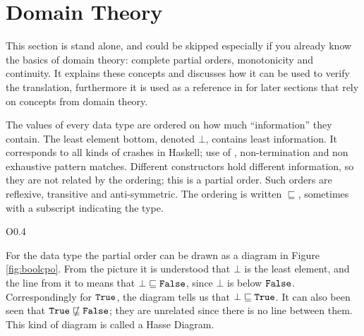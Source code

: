 \section{Domain Theory}
\label{sec:domaintheory}

This section is stand alone, and could be skipped especially if you
already know the basics of domain theory: comp\-lete partial orders,
monotonicity and continuity.  It explains these concepts and discusses
how it can be used to verify the translation, furthermore it is used
as a reference in for later sections that rely on concepts from domain
theory.

The values of every data type are ordered on how much ``information''
they contain. The least element bottom, denoted $\bot$, contains least
information. It corresponds to all kinds of crashes in Haskell; use of
, non-termination and non exhaustive pattern matches.
Different constructors hold different information, so they are not
related by the ordering; this is a partial order. Such orders are
reflexive, transitive and anti-symmetric. The ordering is written
$\sqsubseteq$, sometimes with a subscript indicating the type.

\begin{wrapfigure}{O}{0.4\textwidth} %
\vspace{-7pt}
\centering 
\vspace{-7pt}
\caption{
    The order of Bool values.
    \label{fig:boolcpo}
}
\end{wrapfigure}
For the  data type the partial order can be drawn as a
diagram in Figure \ref{fig:boolcpo}.  From the picture it is
understood that $\bot$ is the least element, and the line from it to
 means that $\bot \sqsubseteq \texttt{False}$, since $\bot$ is
below $\texttt{False}$. Correspondingly for $\texttt{True}$, the diagram tells
us that $\bot \sqsubseteq \texttt{True}$. It can also been seen that
$\texttt{True} \,\,\, /\!\!\!\!\!\!\sqsubseteq \texttt{False}$; they are unrelated since there is
no line between them. This kind of diagram is called a Hasse Diagram.

%


